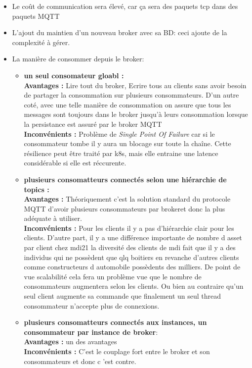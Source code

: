     \begin{itemize}
        \renewcommand{\labelitemi}{$\bullet$}
        \item Le coût de communication sera élevé, car ça sera des paquets tcp dans des paquets MQTT 
        \item L'ajout du maintien d’un nouveau broker avec sa BD: ceci ajoute de la complexité à gérer.
        \item La manière de consommer depuis le broker: 
        \begin{itemize}
            \item \textbf{un seul consomateur gloabl :} \\
            \textbf{Avantages :} Lire tout du broker, Ecrire tous au clients sans avoir besoin de partager la consommation 
            sur plusieurs consommateurs. D'un autre coté, avec une telle manière de consommation on assure que tous les messages 
            sont toujours dans le broker jusqu'à leurs consommation lorsque la persistance est assuré par le broker MQTT\\
            \textbf{Inconvénients :} Problème de \textit{Single Point Of Failure} car si le consommateur tombe il y aura un blocage sur toute 
            la chaîne. Cette résilience peut être traité par \gls{k8s}, mais elle entraine une latence considérable si elle est réccurente. 
            \item \textbf{plusieurs consomatteurs connectés selon une hiérarchie de topics :} \\
            \textbf{Avantages :} Théoriquement c'est la solution standard du protocole MQTT d'avoir plusieurs consommateurs 
                    par brokeret donc la plus adéquate à utiliser. \\
            \textbf{Inconvénients :} Pour les clients il y a pas d'hiérarchie clair pour les clients. 
                    D'autre part, il y a une différence importante de nombre d asset par client chez \gls{mdi21} 
                    la diversité des clients de \gls{mdi} fait que il y a des individus qui ne possèdent que qlq boitiers 
                    en revanche d'autres clients comme constructeurs d automobile possèdents des milliers. De point de vue 
                    scalabilité cela fera un problème vue que le nombre de consommateurs augmentera selon les clients.
                    Ou bien au contraire qu'un seul client augmente sa commande que finalement un seul thread consommateur 
                    n'accepte plus de connexions.
            \item \textbf{plusieurs consomatteurs connectés aux instances, un consommateur par instance de broker}: \\
            \textbf{Avantages :} un des avantages \\
            \textbf{Inconvénients :} C'est le couplage fort entre le broker et son consommateurs et donc c 'est contre.\\
        \end{itemize}
    \end{itemize}


